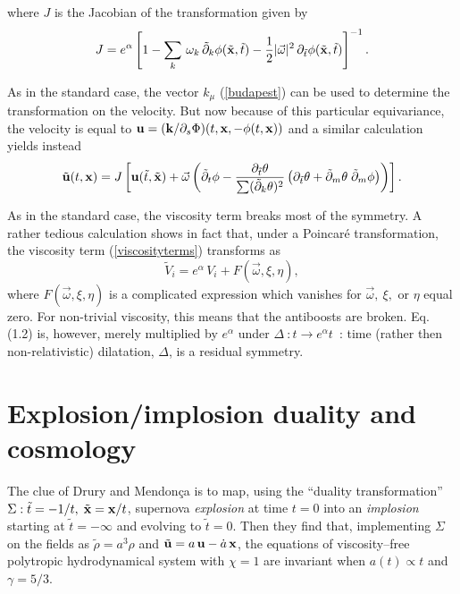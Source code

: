 \documentclass[11pt,a4paper]{article}
\let\ssection=\section
\renewcommand{\section}{\setcounter{equation}{0}\ssection}
\begin{document}
where $J$ is the Jacobian of the transformation given by
\begin{eqnarray}
J=e^\alpha\left[1-\sum_k\,\omega_k\,\tilde{\partial}_{k}
\phi(\tilde{\bf x},\tilde{t})
-\frac{1}{2}\vert\vec{\omega}\vert^2\,\partial_{\tilde{t}}
\phi(\tilde{\bf x},\tilde{t})\right]^{-1}.
\end{eqnarray}

As in the standard case, the vector $k_\mu$
(\ref{budapest}) can be used to determine the transformation on the
velocity. But now because of this particular equivariance,
the velocity is equal to
${\bf u}=\displaystyle{({\bf k}/\partial_s\Phi)(t,{\bf x},
-\phi(t,{\bf x}))}$ and a similar calculation yields instead
\begin{eqnarray}
\tilde{{\bf u}}(t,{\bf x})=J\left[{\bf u}(\tilde{t},\tilde{\bf x})
+\vec{\omega}
\left(\tilde{\partial}_{t}\phi-
\frac{\partial_{\tilde{t}}\theta}{\sum(
\tilde{\partial}_{k}\theta)^2}
\left(\partial_{\tilde{t}}\theta+\tilde{\partial}_{m}
\theta\;\tilde{\partial}_{m}\phi\right)
\right)\right].
\label{chat}
\end{eqnarray}


As in
the standard case, the viscosity term breaks most of the symmetry. A rather
tedious
calculation shows in fact that, under a Poincar\'e transformation,
the viscosity term (\ref{viscosityterms})
transforms as
\begin{equation}
    \tilde{V}_{i}=e^{\alpha}\,V_{i}+F(\vec{\omega},\xi,\eta),
\end{equation}
where $F(\vec{\omega},\xi,\eta)$ is a complicated expression
which vanishes for $\vec{\omega},\ \xi,$ or $\eta$ equal zero.
For non-trivial viscosity, this means that the antiboosts are broken.
Eq. (1.2) is, however, merely multiplied by $e^{\alpha}$
 under $\Delta~: t\to e^{\alpha}t$~:
time  (rather then
non-relativistic) dilatation, $\Delta$,
is a residual symmetry.


\section{Explosion/implosion duality and cosmology}

The clue of Drury and Mendon\c ca \cite{DM} is to map, using the ``duality
transformation''
 $\Sigma: \tilde{t}=-1/t,\;
\tilde{\bf x}={\bf x}/t$, supernova
{\it explosion} at time $t=0$
into  an {\it implosion} starting at $\tilde{t}=-\infty$ and evolving to
$\tilde{t}=0$. Then they find that, implementing $\Sigma$ on the fields as
$\tilde{\rho}=a^3\rho
$ and
$\tilde{\bf u}=a\,{\bf u}-\dot{a}\,{\bf x}$,
the equations
of viscosity--free polytropic
hydrodynamical system with $\chi=1$
are  invariant when $a(t)\propto t$ and $\gamma=5/3$.
\end{document}
